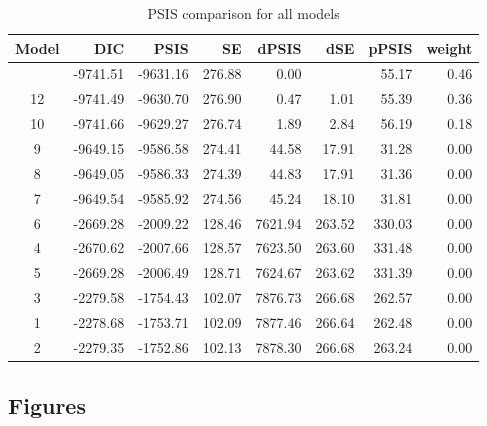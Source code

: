 \documentclass[
sn-apacite
]{sn-jnl}
\begin{document}
\begin{longtable}[]{@{}crrrrrrr@{}}

\caption{\label{tbl-rq3-psis}PSIS comparison for all models}

\tabularnewline

\toprule\noalign{}
Model & DIC & PSIS & SE & dPSIS & dSE & pPSIS & weight \\
\midrule\noalign{}
\endhead
\bottomrule\noalign{}
\endlastfoot
11 & -9741.51 & -9631.16 & 276.88 & 0.00 & & 55.17 & 0.46 \\
12 & -9741.49 & -9630.70 & 276.90 & 0.47 & 1.01 & 55.39 & 0.36 \\
10 & -9741.66 & -9629.27 & 276.74 & 1.89 & 2.84 & 56.19 & 0.18 \\
9 & -9649.15 & -9586.58 & 274.41 & 44.58 & 17.91 & 31.28 & 0.00 \\
8 & -9649.05 & -9586.33 & 274.39 & 44.83 & 17.91 & 31.36 & 0.00 \\
7 & -9649.54 & -9585.92 & 274.56 & 45.24 & 18.10 & 31.81 & 0.00 \\
6 & -2669.28 & -2009.22 & 128.46 & 7621.94 & 263.52 & 330.03 & 0.00 \\
4 & -2670.62 & -2007.66 & 128.57 & 7623.50 & 263.60 & 331.48 & 0.00 \\
5 & -2669.28 & -2006.49 & 128.71 & 7624.67 & 263.62 & 331.39 & 0.00 \\
3 & -2279.58 & -1754.43 & 102.07 & 7876.73 & 266.68 & 262.57 & 0.00 \\
1 & -2278.68 & -1753.71 & 102.09 & 7877.46 & 266.64 & 262.48 & 0.00 \\
2 & -2279.35 & -1752.86 & 102.13 & 7878.30 & 266.68 & 263.24 & 0.00 \\

\end{longtable}

\newpage{}

\subsection{Figures}\label{sec-appC}
\end{document}
